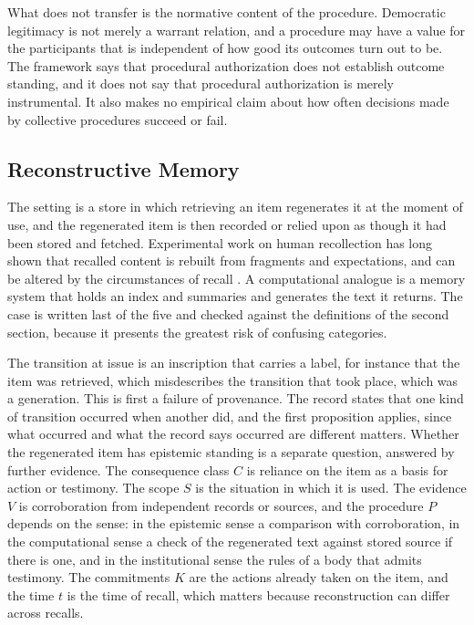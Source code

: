What does not transfer is the normative content of the procedure. Democratic legitimacy is not merely a warrant relation, and a procedure may have a value for the participants that is independent of how good its outcomes turn out to be. The framework says that procedural authorization does not establish outcome standing, and it does not say that procedural authorization is merely instrumental. It also makes no empirical claim about how often decisions made by collective procedures succeed or fail.

\subsection{Reconstructive Memory}

The setting is a store in which retrieving an item regenerates it at the moment of use, and the regenerated item is then recorded or relied upon as though it had been stored and fetched. Experimental work on human recollection has long shown that recalled content is rebuilt from fragments and expectations, and can be altered by the circumstances of recall \cite{bartlett,loftus}. A computational analogue is a memory system that holds an index and summaries and generates the text it returns. The case is written last of the five and checked against the definitions of the second section, because it presents the greatest risk of confusing categories.

The transition at issue is an inscription that carries a label, for instance that the item was retrieved, which misdescribes the transition that took place, which was a generation. This is first a failure of provenance. The record states that one kind of transition occurred when another did, and the first proposition applies, since what occurred and what the record says occurred are different matters. Whether the regenerated item has epistemic standing is a separate question, answered by further evidence. The consequence class $C$ is reliance on the item as a basis for action or testimony. The scope $S$ is the situation in which it is used. The evidence $V$ is corroboration from independent records or sources, and the procedure $P$ depends on the sense: in the epistemic sense a comparison with corroboration, in the computational sense a check of the regenerated text against stored source if there is one, and in the institutional sense the rules of a body that admits testimony. The commitments $K$ are the actions already taken on the item, and the time $t$ is the time of recall, which matters because reconstruction can differ across recalls.

